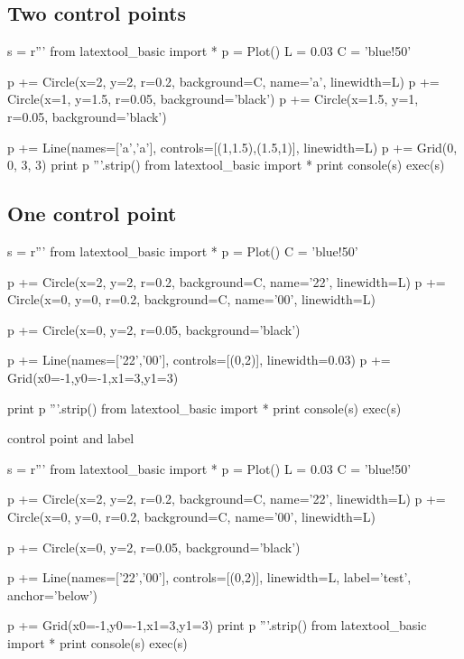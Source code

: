 \newpage
\subsection{Two control points}

\begin{python}
s = r'''
from latextool_basic import *
p = Plot()
L = 0.03
C = 'blue!50'

p += Circle(x=2, y=2, r=0.2, background=C, name='a', linewidth=L)
p += Circle(x=1, y=1.5, r=0.05, background='black')
p += Circle(x=1.5, y=1, r=0.05, background='black')

p += Line(names=['a','a'], controls=[(1,1.5),(1.5,1)], linewidth=L)
p += Grid(0, 0, 3, 3)
print p
'''.strip()
from latextool_basic import *
print console(s)
exec(s)
\end{python}


\newpage
\subsection{One control point}

\begin{python}
s = r'''
from latextool_basic import *
p = Plot()
C = 'blue!50'

p += Circle(x=2, y=2, r=0.2, background=C, name='22', linewidth=L)
p += Circle(x=0, y=0, r=0.2, background=C, name='00', linewidth=L)

p += Circle(x=0, y=2, r=0.05, background='black')

p += Line(names=['22','00'], controls=[(0,2)], linewidth=0.03)
p += Grid(x0=-1,y0=-1,x1=3,y1=3)

print p
'''.strip()
from latextool_basic import *
print console(s)
exec(s)
\end{python}



 control point and label
\begin{python}
s = r'''
from latextool_basic import *
p = Plot()
L = 0.03
C = 'blue!50'

p += Circle(x=2, y=2, r=0.2, background=C, name='22', linewidth=L)
p += Circle(x=0, y=0, r=0.2, background=C, name='00', linewidth=L)

p += Circle(x=0, y=2, r=0.05, background='black')

p += Line(names=['22','00'], controls=[(0,2)], linewidth=L, label='test', anchor='below')

p += Grid(x0=-1,y0=-1,x1=3,y1=3)
print p
'''.strip()
from latextool_basic import *
print console(s)
exec(s)
\end{python}



